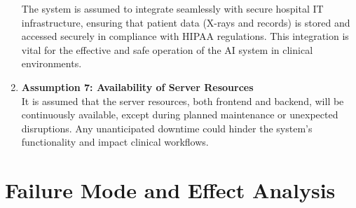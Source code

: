\documentclass{article}
\begin{document}
\begin{enumerate}
    The system is assumed to integrate seamlessly with secure hospital IT infrastructure, ensuring
    that patient data (X-rays and records) is stored and accessed securely in compliance with
    HIPAA regulations. This integration is vital for the effective and safe operation of the AI
    system in clinical environments.
  \item \textbf{Assumption 7: Availability of Server Resources} \\
    It is assumed that the server resources, both frontend and backend, will be continuously
    available, except during planned maintenance or unexpected disruptions. Any unanticipated
    downtime could hinder the system's functionality and impact clinical workflows.
\end{enumerate}

\section{Failure Mode and Effect Analysis}
\end{document}
